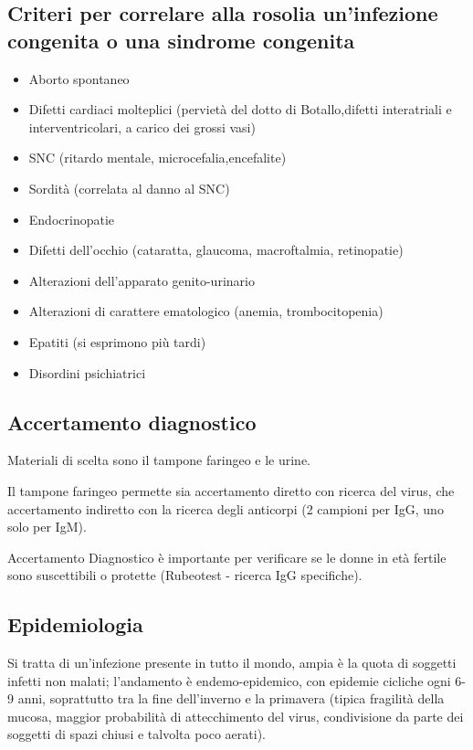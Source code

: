\subsection{Criteri per correlare alla rosolia un'infezione congenita o una sindrome congenita}

\begin{itemize}
\item
  Aborto spontaneo
\item
  Difetti cardiaci molteplici (pervietà del dotto di Botallo,difetti
  interatriali e interventricolari, a carico dei grossi vasi)
\item
  SNC (ritardo mentale, microcefalia,encefalite)
\item
  Sordità (correlata al danno al SNC)
\item
  Endocrinopatie
\item
  Difetti dell'occhio (cataratta, glaucoma, macroftalmia, retinopatie)
\item
  Alterazioni dell'apparato genito-urinario
\item
  Alterazioni di carattere ematologico (anemia, trombocitopenia)
\item
  Epatiti (si esprimono più tardi)
\item
  Disordini psichiatrici
\end{itemize}

\subsection{Accertamento diagnostico}

Materiali di scelta sono il tampone
faringeo e le urine.

Il tampone faringeo permette sia accertamento diretto con ricerca del
virus, che accertamento indiretto con la ricerca degli anticorpi (2
campioni per IgG, uno solo per IgM).

Accertamento Diagnostico è importante per verificare se le donne in età
fertile sono suscettibili o protette (Rubeotest - ricerca IgG
specifiche).

\subsection{Epidemiologia}

Si tratta di un'infezione presente in tutto il mondo, ampia è la quota
di soggetti infetti non malati; l'andamento è endemo-epidemico, con
epidemie cicliche ogni 6-9 anni, soprattutto tra la fine dell'inverno e
la primavera (tipica fragilità della mucosa, maggior probabilità di
attecchimento del virus, condivisione da parte dei soggetti di spazi
chiusi e talvolta poco aerati).

